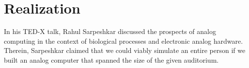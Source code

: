 




\section*{Realization}

In his TED-X talk, Rahul Sarpeshkar discussed the prospects of analog computing in the context of biological processes and electronic analog hardware. Therein, Sarpeshkar claimed that we could viably simulate an entire person if we built an analog computer that spanned the size of the given auditorium.

